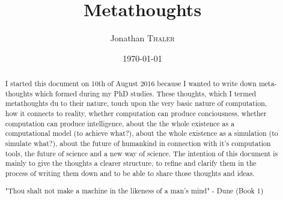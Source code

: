 \documentclass{article}
\title{Metathoughts} %
\author{Jonathan \textsc{Thaler}} %
\date{\today} %
\begin{document}
\maketitle %

\begin{abstract}
I started this document on 10th of August 2016 because I wanted to write down meta-thoughts which formed during my PhD studies. These thoughts, which I termed metathoughts du to their nature, touch upon the very basic nature of computation, how it connects to reality, whether computation can produce conciousness, whether computation can produce intelligence, about the the whole existence as a computational model (to achieve what?), about the whole existence as a simulation (to simulate what?), about the future of humankind in connection with it's computation tools, the future of science and a new way of science. The intention of this document is mainly to give the thoughts a clearer structure, to refine and clarify them in the process of writing them down and to be able to share those thoughts and ideas.
\bigskip

"Thou shalt not make a machine in the likeness of a man's mind" - Dune (Book 1)
 
\end{abstract}
\end{document}
